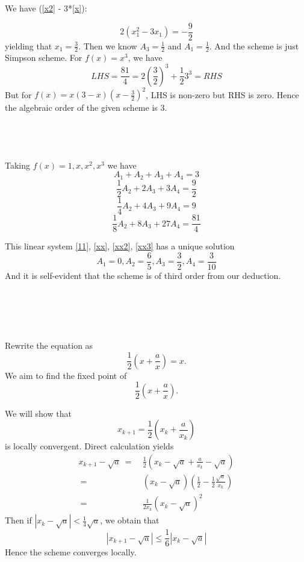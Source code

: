 \documentclass{article}
\begin{document}
We have (\eqref{x2} - 3*\eqref{x}):

\begin{equation}
\label{x2-3x}
2(x_1^2-3x_1) = -\frac 92
\end{equation}
yielding that $x_1 = \frac 32$.
Then we know $A_3 = \frac 12$ and $A_1 = \frac 12$. And the scheme is just Simpson scheme. For $f(x) = x^3$, we have $$LHS = \frac{81}{4} = 2(\frac 32)^3 + \frac 123^3 = RHS$$
But for $f(x) = x(3-x)(x-\frac 32)^2$, LHS is non-zero but RHS is zero. Hence the algebraic order of the given scheme is 3.

\subsection{~}
Taking $f(x) = 1, x, x^2, x^3$ we have 
\begin{equation}
\label{11}
A_1 + A_2 + A_3 +A_4= 3 
\end{equation}
\begin{equation}
\label{xx}
\frac{1}{2}A_2 + 2A_3 + 3A_4 = \frac 92
\end{equation}
\begin{equation}
\label{xx2}
\frac{1}{4}A_2 + 4A_3 + 9A_4 = 9
\end{equation}
\begin{equation}
\label{xx3}
\frac{1}{8}A_2 + 8A_3 + 27A_4 = \frac{81}{4}
\end{equation}

This linear system \eqref{11}, \eqref{xx}, \eqref{xx2}, \eqref{xx3} has a unique solution 
$$A_1 = 0, A_2 = \frac{6}{5}, A_3 = \frac{3}{2}, A_4 = \frac{3}{10}$$
And it is self-evident that the scheme is of third order from our deduction.


\section{~}
Rewrite the equation as $$\frac 12(x + \frac ax) = x.$$ We aim to find the fixed point of 
$$\frac{1}{2}(x+ \frac ax).$$


We will show that 
\begin{equation}
\label{iter}
x_{k+1} = \frac 12 (x_k + \frac{a}{x_k})
\end{equation} is locally convergent. Direct calculation yields
\begin{equation}
\label{iter2}
\begin{split}
x_{k+1} - \sqrt{a}
 ~=~& \frac 12 (x_k - \sqrt{a} + \frac{a}{x_k} - \sqrt{a})\\
~=~& (x_k - \sqrt a)(\frac 12 - \frac 12 \frac{\sqrt a}{x_k})\\
~=~& \frac{1}{2x_k} (x_k - \sqrt a)^2
\end{split}
\end{equation}
Then if $|x_k - \sqrt{a}|<\frac{1}{4} \sqrt a$, we obtain that $$|x_{k+1} - \sqrt{a}| \le  \frac 16 |x_k - \sqrt a|$$
Hence the scheme converges locally. 
\end{document}

